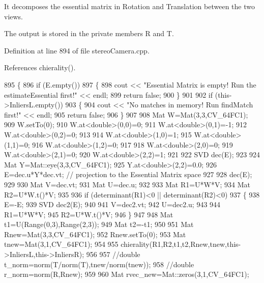 It decomposes the essential matrix in Rotation and Translation between the two views. 

The output is stored in the private members R and T. 

Definition at line 894 of file stereo\+Camera.\+cpp.



References chierality().


\begin{DoxyCode}
895 \{
896     \textcolor{keywordflow}{if} (E.empty())
897     \{
898         cout << \textcolor{stringliteral}{"Essential Matrix is empty! Run the estimateEssential first!"} << endl;
899         \textcolor{keywordflow}{return} \textcolor{keyword}{false};
900     \}
901     
902     \textcolor{keywordflow}{if} (this->InliersL.empty())
903     \{
904         cout << \textcolor{stringliteral}{"No matches in memory! Run findMatch first!"} << endl;
905         \textcolor{keywordflow}{return} \textcolor{keyword}{false};
906     \}
907 
908     Mat W=Mat(3,3,CV\_64FC1);
909     W.setTo(0);
910     W.at<\textcolor{keywordtype}{double}>(0,0)=0;
911     W.at<\textcolor{keywordtype}{double}>(0,1)=-1;
912     W.at<\textcolor{keywordtype}{double}>(0,2)=0;
913 
914     W.at<\textcolor{keywordtype}{double}>(1,0)=1;
915     W.at<\textcolor{keywordtype}{double}>(1,1)=0;
916     W.at<\textcolor{keywordtype}{double}>(1,2)=0;
917 
918     W.at<\textcolor{keywordtype}{double}>(2,0)=0;
919     W.at<\textcolor{keywordtype}{double}>(2,1)=0;
920     W.at<\textcolor{keywordtype}{double}>(2,2)=1;
921 
922     SVD dec(E);
923     
924     Mat Y=Mat::eye(3,3,CV\_64FC1);
925     Y.at<\textcolor{keywordtype}{double}>(2,2)=0.0;
926     E=dec.u*Y*dec.vt; \textcolor{comment}{// projection to the Essential Matrix space}
927     
928     dec(E);
929 
930     Mat V=dec.vt;
931     Mat U=dec.u;
932 
933     Mat R1=U*W*V;
934     Mat R2=U*W.t()*V;
935     
936     \textcolor{keywordflow}{if} (determinant(R1)<0 || determinant(R2)<0)
937     \{
938         E=-E;
939         SVD dec2(E);
940 
941         V=dec2.vt;
942         U=dec2.u;
943         
944         R1=U*W*V;
945         R2=U*W.t()*V;
946     \}
947 
948     Mat t1=U(Range(0,3),Range(2,3));
949     Mat t2=-t1;
950 
951     Mat Rnew=Mat(3,3,CV\_64FC1);
952     Rnew.setTo(0);
953     Mat tnew=Mat(3,1,CV\_64FC1);
954 
955     chierality(R1,R2,t1,t2,Rnew,tnew,this->InliersL,this->InliersR);
956     
957     \textcolor{comment}{//double t\_norm=norm(T/norm(T),tnew/norm(tnew));}
958     \textcolor{comment}{//double r\_norm=norm(R,Rnew);}
959     
960     Mat rvec\_new=Mat::zeros(3,1,CV\_64FC1);

\end{DoxyCode}
